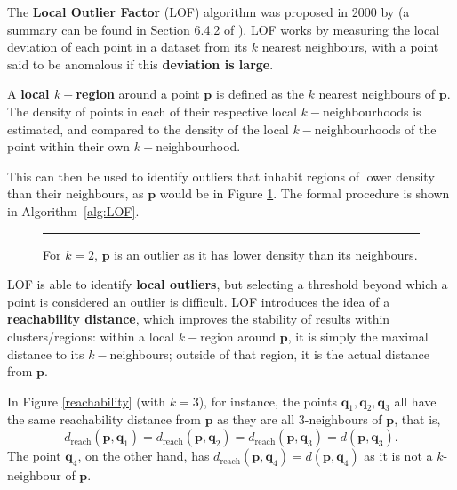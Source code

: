 The \textbf{Local Outlier Factor} (LOF) algorithm was proposed in 2000 by \cite{LOF} 
(a summary can be found in Section 6.4.2 of \cite{A10}). 
LOF works by measuring the local deviation of each point in a dataset from its $k$ nearest neighbours, with a point said to be anomalous if this \textbf{deviation is large}.

A \textbf{local $k-$region} around a point $\mathbf{p}$ is defined as the $k$ nearest neighbours of $\mathbf{p}$. The density of points in each of their respective local $k-$neighbourhoods is estimated, and compared to the density of the local $k-$neighbourhoods of the point within their own $k-$neighbourhood.

This can then be used to identify outliers that inhabit regions of lower density than their neighbours,
as $\mathbf{p}$ would be in Figure \ref{lofoutlier}. The formal procedure is shown in Algorithm~\ref{alg:LOF}. 

\begin{figure}[H]
\hrule \vspace{0.4cm}
\centering
{}
\caption{For $k=2$, $\mathbf{p}$ is an outlier as it has lower density than its neighbours.}
\label{lofoutlier}
\end{figure}
\noindent LOF is able to identify \textbf{local outliers}, but selecting a threshold beyond which a point is considered an outlier is difficult. \newl LOF introduces the idea of a \textbf{reachability distance}, which improves the stability of results within clusters/regions: within a local $k-$region around $\mathbf{p}$, it is simply the maximal distance to its $k-$neighbours; outside of that region, it is the actual distance from $\mathbf{p}$. 
\par In Figure \ref{reachability} (with $k=3$), for instance, the points $\mathbf{q}_1, \mathbf{q}_2, \mathbf{q}_3$ all have the same reachability distance from $\mathbf{p}$ as they are all $3$-neighbours of $\mathbf{p}$, that is, 
$$
d_{\text{reach}}(\mathbf{p}, \mathbf{q}_1) 
= d_{\text{reach}}(\mathbf{p}, \mathbf{q}_2)
= d_{\text{reach}}(\mathbf{p}, \mathbf{q}_3)
= d(\mathbf{p}, \mathbf{q}_3)
.$$
The point $\mathbf{q}_4$, on the other hand, has 
$d_{\text{reach}}(\mathbf{p}, \mathbf{q}_4)
= d(\mathbf{p}, \mathbf{q}_4)
$
as it is not a $k$-neighbour of $\mathbf{p}$.

